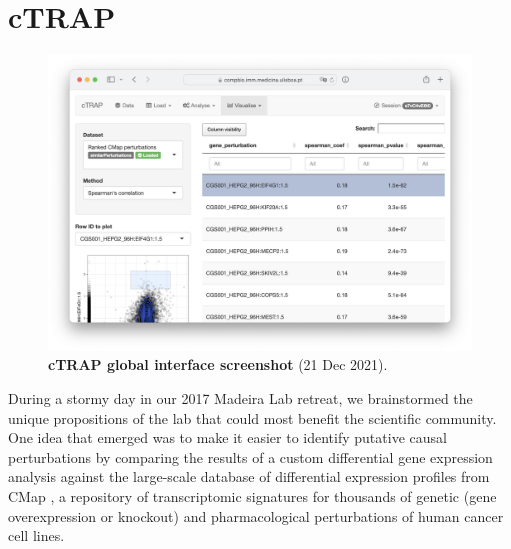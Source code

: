 
\chapter{cTRAP}
\label{chap:ctrap}

\begin{figure}[!b]
  \vspace*{-1cm}
  \includegraphics[width=.96\textwidth]{images/cTRAP/screenshot}
  \centering
  \vspace*{-.5cm}
  \caption[cTRAP global interface screenshot]{\textbf{cTRAP global interface screenshot} (21 Dec 2021).}
  \label{fig:cTRAP-screenshot}
\end{figure}

During a stormy day in our 2017 Madeira Lab retreat, we brainstormed the unique propositions of the lab that could most benefit the scientific community. One idea that emerged was to make it easier to identify putative causal perturbations by comparing the results of a custom differential gene expression analysis against the large-scale database of differential expression profiles from CMap \cite{subramanian:2017ul}, a repository of transcriptomic signatures for thousands of genetic (gene overexpression or knockout) and pharmacological perturbations of human cancer cell lines. %

